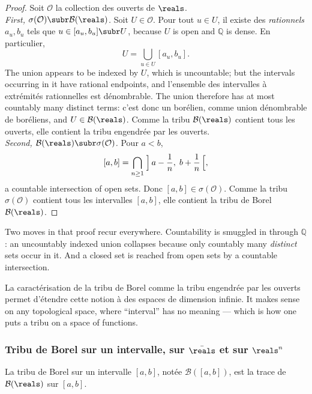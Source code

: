 \begin{proof}
  Soit $\mathcal{O}$ la collection des ouverts de $\reals$.\\

  \emph{First, $\sigma(\mathcal{O}) \subr \mathcal{B}(\reals)$.} Soit $U \in
  \mathcal{O}$. Pour tout $u \in U$, il existe des \emph{rationnels} $a_{u}, b_{u}$
  tels que $u \in [a_{u},b_{u}] \subr U$, because $U$ is open and $\mathbb{Q}$ is
  dense. En particulier,
  \[
    U = \bigcup_{u \in U} [a_{u},b_{u}].
  \]
  The union appears to be indexed by $U$, which is uncountable; but the intervals
  occurring in it have rational endpoints, and l'ensemble des intervalles à
  extrémités rationnelles est dénombrable. The union therefore has at most countably
  many distinct terms: c'est donc un borélien, comme union dénombrable de boréliens,
  and $U \in \mathcal{B}(\reals)$. Comme la tribu $\mathcal{B}(\reals)$ contient
  tous les ouverts, elle contient la tribu engendrée par les ouverts.\\

  \emph{Second, $\mathcal{B}(\reals) \subr \sigma(\mathcal{O})$.} Pour $a < b$,
  \[
    [a,b] = \bigcap_{n \geq 1} \;\Bigl]\,a - \frac{1}{n},\; b + \frac{1}{n}\,\Bigr[,
  \]
  a countable intersection of open sets. Donc $[a,b] \in \sigma(\mathcal{O})$.
  Comme la tribu $\sigma(\mathcal{O})$ contient tous les intervalles $[a,b]$, elle
  contient la tribu de Borel $\mathcal{B}(\reals)$.
\end{proof}

Two moves in that proof recur everywhere. Countability is smuggled in through
$\mathbb{Q}$: an uncountably indexed union collapses because only countably many
\emph{distinct} sets occur in it. And a closed set is reached from open sets by a
countable intersection.

\begin{remark}
  La caractérisation de la tribu de Borel comme la tribu engendrée par les ouverts
  permet d'étendre cette notion à des espaces de dimension infinie. It makes sense
  on any topological space, where ``interval'' has no meaning --- which is how one
  puts a tribu on a space of functions.
\end{remark}

\subsubsection{Tribu de Borel sur un intervalle, sur $\bar{\reals}$ et sur $\reals^{n}$}

\begin{definition}
  La tribu de Borel sur un intervalle $[a,b]$, notée $\mathcal{B}([a,b])$, est la
  trace de $\mathcal{B}(\reals)$ sur $[a,b]$.
\end{definition}

